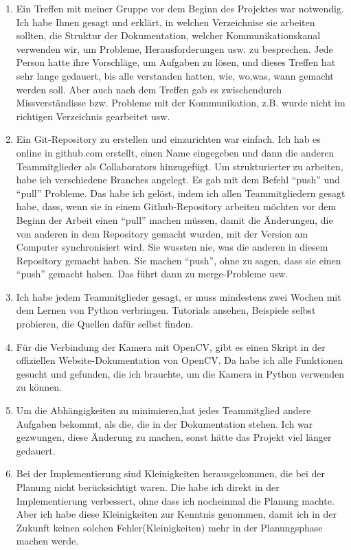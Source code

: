 \begin{itemize}
\begin{enumerate}
	\item Ein Treffen mit meiner Gruppe vor dem Beginn des Projektes war notwendig. Ich habe Ihnen gesagt und erkl\"art, in welchen Verzeichnise sie arbeiten sollten, die Struktur der Dokumentation, welcher Kommunikationskanal verwenden wir, um Probleme, Herausforderungen usw. zu besprechen. Jede Person hatte ihre Vorschl\"age, um Aufgaben zu l\"osen, und dieses Treffen hat sehr lange gedauert, bis alle verstanden hatten, wie, wo,was, wann gemacht werden soll. Aber auch nach dem Treffen gab es zwischendurch Missverst\"andisse bzw. Probleme mit der Kommunikation, z.B. wurde nicht im richtigen Verzeichnis gearbeitet usw. 
	
	\item Ein Git-Repository zu erstellen und einzurichten war einfach. Ich hab es online in github.com erstellt, einen Name eingegeben und dann die anderen Teammitglieder als Collaborators hinzugef\"ugt. Um strukturierter zu arbeiten, habe ich verschiedene Branches angelegt. Es gab mit dem Befehl ``push'' und ``pull'' Probleme. Das habe ich gel\"ost, indem ich allen Teammitgliedern gesagt habe, dass, wenn sie in einem Github-Repository arbeiten m\"ochten vor dem Beginn der Arbeit einen ``pull'' machen m\"ussen, damit die \"Anderungen, die von anderen in dem Repository gemacht wurden, mit der Version am Computer synchronisiert wird. Sie wussten nie, was die anderen in diesem Repository gemacht haben. Sie machen ``push'', ohne zu sagen, dass sie einen ``push'' gemacht haben. Das f\"uhrt dann zu merge-Probleme usw. 
	
	\item Ich habe jedem Teammitglieder gesagt, er muss mindestens zwei Wochen mit dem Lernen von Python verbringen. Tutorials ansehen, Beispiele selbst probieren, die Quellen daf\"ur selbst finden. 
	
	\item  F\"ur die Verbindung der Kamera mit OpenCV, gibt es einen Skript in der offiziellen Website-Dokumentation von OpenCV. Da habe ich alle Funktionen gesucht und gefunden, die ich brauchte, um die Kamera in Python verwenden zu k\"onnen. 
	
	\item Um die Abh\"angigkeiten zu minimieren,hat jedes Teammitglied andere Aufgaben bekommt, als die, die in der Dokumentation stehen. Ich war gezwungen, diese \"Anderung zu machen, sonst h\"atte das Projekt viel l\"anger gedauert. 
	
	\item Bei der Implementierung sind Kleinigkeiten herausgekommen, die bei der Planung nicht ber\"ucksichtigt waren. Die habe ich direkt in der Implementierung verbessert, ohne dass ich nocheinmal die Planung machte. Aber ich habe diese Kleinigkeiten zur Kenntnis genommen, damit ich in der Zukunft keinen solchen Fehler(Kleinigkeiten) mehr in der Planungsphase machen werde. 
	

\end{enumerate}
\end{itemize}
